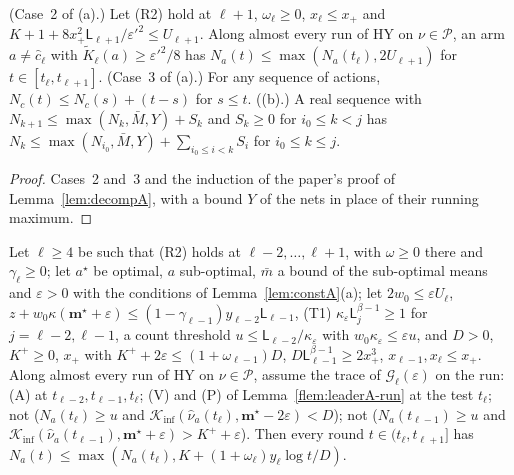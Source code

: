 \documentclass[11pt]{article}
\newcommand{\Kinf}{\mathcal K_{\inf}}
\newcommand{\cP}{\mathcal P}
\begin{document}
\begin{lemma}\label{flem:decompA-run}
(Case~2 of (a).) Let (R2) hold at $\ell+1$, $\omega_\ell\ge0$, $x_\ell\le x_+$ and
$K+1+8x_+^2\mathsf L_{\ell+1}/\varepsilon'^2\le U_{\ell+1}$. Along almost every run of HY on
$\nu\in\cP$, an arm $a\ne\hat c_\ell$ with $\tilde K_\ell(a)\ge\varepsilon'^2/8$ has
$N_a(t)\le\max(N_a(t_\ell),2U_{\ell+1})$ for $t\in[t_\ell,t_{\ell+1}]$.
(Case~3 of (a).) For any sequence of actions, $N_c(t)\le N_c(s)+(t-s)$ for $s\le t$.
((b).) A real sequence with $N_{k+1}\le\max(N_k,\bar M,Y)+S_k$ and $S_k\ge0$ for $i_0\le k<j$ has
$N_k\le\max(N_{i_0},\bar M,Y)+\sum_{i_0\le i<k}S_i$ for $i_0\le k\le j$.
\end{lemma}

\begin{proof}
Cases~2 and~3 and the induction of the paper's proof of Lemma~\ref{lem:decompA}, with a bound $Y$
of the nets in place of their running maximum.
\end{proof}

\begin{lemma}\label{flem:goodA-good}
Let $\ell\ge4$ be such that (R2) holds at $\ell-2,\dots,\ell+1$, with $\omega\ge0$ there and
$\gamma_\ell\ge0$; let $a^\star$ be optimal, $a$ sub-optimal, $\bar m$ a bound of the sub-optimal
means and $\varepsilon>0$ with the conditions of Lemma~\ref{lem:constA}(a); let $2w_0\le\varepsilon
U_\ell$, $z+w_0\kappa(\mathbf m^\star+\varepsilon)\le(1-\gamma_{\ell-1})y_{\ell-2}\mathsf
L_{\ell-1}$, (T1) $\kappa_\varepsilon\mathsf L_j^{\beta-1}\ge1$ for $j=\ell-2,\ell-1$, a count
threshold $u\le\mathsf L_{\ell-2}/\kappa_\varepsilon$ with $w_0\kappa_\varepsilon\le\varepsilon u$,
and $D>0$, $K^+\ge0$, $x_+$ with $K^++2\varepsilon\le(1+\omega_{\ell-1})D$,
$D\mathsf L_{\ell-1}^{\beta-1}\ge2x_+^3$, $x_{\ell-1},x_\ell\le x_+$. Along almost every run of HY
on $\nu\in\cP$, assume the trace of $\mathcal G_\ell(\varepsilon)$ on the run: (A) at
$t_{\ell-2},t_{\ell-1},t_\ell$; (V) and (P) of Lemma~\ref{flem:leaderA-run} at the test $t_\ell$;
not ($N_a(t_\ell)\ge u$ and $\Kinf(\hat\nu_a(t_\ell),\mathbf m^\star-2\varepsilon)<D$); not
($N_a(t_{\ell-1})\ge u$ and $\Kinf(\hat\nu_a(t_{\ell-1}),\mathbf m^\star+\varepsilon)>K^++
\varepsilon$). Then every round $t\in(t_\ell,t_{\ell+1}]$ has
$N_a(t)\le\max(N_a(t_\ell),K+(1+\omega_\ell)y_\ell\log t/D)$.
\end{lemma}
\end{document}
